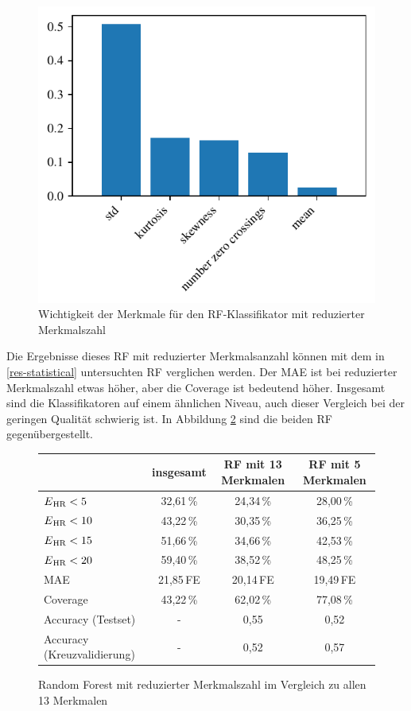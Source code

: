 \begin{figure}[H]
	\centering
	\includegraphics[scale=0.95]{pic/rf-reduced-statistical.pdf}
	\caption{Wichtigkeit der Merkmale für den \ac{RF}-Klassifikator mit reduzierter Merkmalszahl}
	\label{fig:rf-statistical-reduced}
\end{figure}

Die Ergebnisse dieses \acl{RF} mit reduzierter Merkmalsanzahl können mit dem in \ref{res-statistical} untersuchten \acl{RF} verglichen werden. Der \ac{MAE} ist bei reduzierter Merkmalszahl etwas höher, aber die Coverage ist bedeutend höher. Insgesamt sind die Klassifikatoren auf einem ähnlichen Niveau, auch dieser Vergleich bei der geringen Qualität schwierig ist. In Abbildung \ref{fig:ml-statistical-reduced-comparison} sind die beiden \acl{RF} gegenübergestellt.

 \begin{figure}[H]
 	\centering
  	\begin{tabular}{l || c | c | c}
 									& insgesamt 		& RF mit 13 Merkmalen			& RF mit 5 Merkmalen\\\hline
 		$E\textsubscript{HR} < 5$ 		& 32{,}61\,\% 		& 24,34\,\%			& 28,00\,\%	\\
 		$E\textsubscript{HR} < 10$ 		& 43{,}22\,\% 		& 30,35\,\% 			& 36,25\,\%	\\
 		$E\textsubscript{HR} < 15$ 		& 51{,}66\,\% 		& 34,66\,\% 			& 42,53\,\%	\\
 		$E\textsubscript{HR} < 20$ 		& 59{,}40\,\% 		& 38,52\,\% 			& 48,25\,\%\\
 		MAE								& 21{,}85\,\si{FE}	& 20,14\,\si{FE}	& 19{,}49\,\si{FE}\\
 		Coverage						& 43{,22}\,\%		& 62,02\,\%			& 77{,}08\,\%\\
 		Accuracy (Testset)				& -					& 0,55				& 0,52\\
 		Accuracy (Kreuzvalidierung)	 	& -					& 0{,}52				& 0,57\\
 	\end{tabular}
 	\caption{Random Forest mit reduzierter Merkmalszahl im Vergleich zu allen 13 Merkmalen}
 	\label{fig:ml-statistical-reduced-comparison}
 \end{figure}

